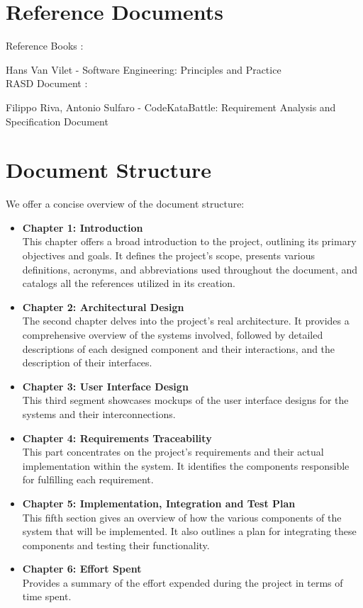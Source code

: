 \documentclass[11pt]{report}
\begin{document}
\section{Reference Documents}

Reference Books : 

Hans Van Vilet - Software Engineering: Principles and Practice
\\

\noindent
RASD Document : 

Filippo Riva, Antonio Sulfaro - CodeKataBattle: Requirement Analysis and Specification Document

\section{Document Structure}

We offer a concise overview of the document structure: 
\begin{itemize}
    \item \textbf{Chapter 1: Introduction}\\
        This chapter offers a broad introduction to the project, outlining its primary objectives and goals.
        It defines the project's scope, presents various definitions, acronyms, and abbreviations used throughout the document, and catalogs all the references utilized in its creation.
    \item \textbf{Chapter 2: Architectural Design}\\
        The second chapter delves into the project's real architecture.
        It provides a comprehensive overview of the systems involved, followed by detailed descriptions of each designed component and their interactions, and the description of their interfaces.
    \item \textbf{Chapter 3: User Interface Design}\\
        This third segment showcases mockups of the user interface designs for the systems and their interconnections.
    \item \textbf{Chapter 4: Requirements Traceability}\\
        This part concentrates on the project's requirements and their actual implementation within the system.
        It identifies the components responsible for fulfilling each requirement.
    \item \textbf{Chapter 5: Implementation, Integration and Test Plan}\\
        This fifth section gives an overview of how the various components of the system that will be implemented.
        It also outlines a plan for integrating these components and testing their functionality.
    \item \textbf{Chapter 6: Effort Spent}\\
        Provides a summary of the effort expended during the project in terms of time spent.
\end{itemize}
\end{document}
